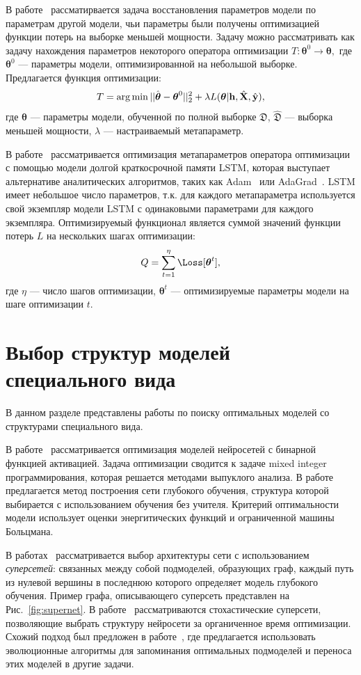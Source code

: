 В работе~\cite{l2l} рассматирвается задача восстановления параметров модели по параметрам  другой модели, чьи параметры были получены оптимизацией функции потерь на выборке меньшей мощности. Задачу можно рассматривать как задачу нахождения параметров некоторого оператора оптимизации $T:\boldsymbol{\theta}^0 \to \boldsymbol{\theta},$ где $\boldsymbol{\theta}^0$ --- параметры модели, оптимизированной на небольшой выборке.  Предлагается функция оптимизации:
\[
    T = \operatorname*{arg\,min} ||\hat{\boldsymbol{\theta}} -  \boldsymbol{\theta}^0||_2^2 + \lambda L(\boldsymbol{\theta}|  \mathbf{h},  \hat{\mathbf{X}}, \hat{\mathbf{y}}),
\]
где $\boldsymbol{\theta}$ --- параметры модели, обученной по полной выборке $\mathfrak{D}$, $\hat{\mathfrak{D}}$ --- выборка меньшей мощности, ${\lambda}$ --- настраиваемый метапараметр.

В работе~\cite{l2l_by_gd_gd} рассматривается оптимизация метапараметров оператора оптимизации с помощью модели долгой краткосрочной памяти LSTM, которая выступает альтернативе аналитических алгоритмов, таких как Adam~\cite{adam} или AdaGrad~\cite{adagrad}. LSTM имеет небольшое число параметров, т.к. для каждого метапараметра используется свой экземпляр модели LSTM с одинаковыми параметрами для каждого экземпляра. Оптимизируемый функционал является суммой значений функции потерь $L$ на нескольких шагах оптимизации:
\[
   Q = \sum_{t=1}^\eta \Loss[\teta^{t}],
\]
где $\eta$ --- число шагов оптимизации, $\boldsymbol{\theta}^t$ --- оптимизируемые параметры модели на шаге оптимизации $t$.


\section{Выбор структур моделей специального вида}
В данном разделе представлены работы по поиску оптимальных моделей со структурами специального вида.

В работе~\cite{mixed} рассматривается оптимизация моделей нейросетей с бинарной функцией активацией. Задача оптимизации сводится к задаче mixed integer программирования, которая решается методами выпуклого анализа.
В работе~\cite{energynet} предлагается метод построения сети глубокого обучения, структура которой выбирается с использованием обучения без учителя. Критерий оптимальности модели использует оценки энергитических функций и ограниченной машины Больцмана.

В работах~\cite{pathnet, supernet} рассматривается выбор архитектуры сети с использованием \textit{суперсетей}: связанных между собой подмоделей, образующих граф, каждый  путь из нулевой вершины в последнюю которого определяет модель глубокого обучения. Пример графа, описывающего суперсеть представлен на Рис.~\ref{fig:supernet}. В работе~\cite{supernet} рассматриваются стохастические суперсети, позволяющие выбрать структуру нейросети за органиченное время оптимизации. 
Схожий подход был предложен в работе~\cite{pathnet}, где предлагается использовать эволюционные алгоритмы для запоминания оптимальных подмоделей и переноса этих моделей в другие задачи.


